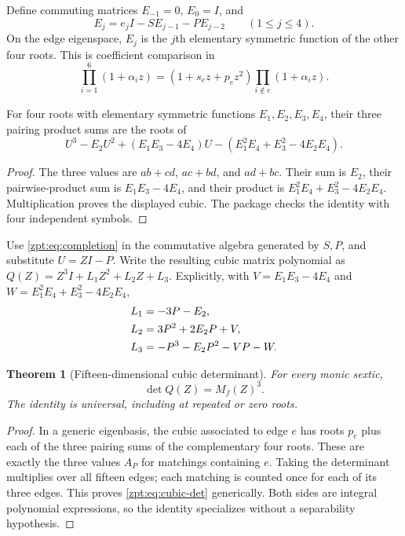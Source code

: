 \documentclass[11pt,letterpaper]{article}
\numberwithin{equation}{section}
\newtheorem{theorem}{Theorem}[section]
\theoremstyle{definition}
\theoremstyle{remark}
\begin{document}
Define commuting matrices $E_{-1}=0$, $E_0=I$, and
\begin{equation}
 E_j=e_jI-SE_{j-1}-PE_{j-2}\qquad(1\le j\le4).\label{zpt:eq:Ej}
\end{equation}
On the edge eigenspace, $E_j$ is the $j$th elementary symmetric function
of the other four roots. This is coefficient comparison in
\[
 \prod_{i=1}^6(1+\alpha_i z)
 =(1+s_ez+p_ez^2)\prod_{i\notin e}(1+\alpha_i z).
\]

\begin{lemma}
\label{zpt:lem:completion}
For four roots with elementary symmetric functions $E_1,E_2,E_3,E_4$,
their three pairing product sums are the roots of
\begin{equation}
 U^3-E_2U^2+(E_1E_3-4E_4)U
 -(E_1^2E_4+E_3^2-4E_2E_4).\label{zpt:eq:completion}
\end{equation}
\end{lemma}
\begin{proof}
The three values are $ab+cd$, $ac+bd$, and $ad+bc$.
Their sum is $E_2$, their pairwise-product sum is $E_1E_3-4E_4$, and their
product is $E_1^2E_4+E_3^2-4E_2E_4$. Multiplication proves the displayed
cubic. The package checks the identity with four independent symbols.
\end{proof}

Use \eqref{zpt:eq:completion} in the commutative algebra generated by $S,P$,
and substitute $U=ZI-P$. Write the resulting cubic matrix polynomial as
$Q(Z)=Z^3I+L_1Z^2+L_2Z+L_3$. Explicitly, with
$V=E_1E_3-4E_4$ and $W=E_1^2E_4+E_3^2-4E_2E_4$,
\begin{align}
 L_1&=-3P-E_2,\notag\\
 L_2&=3P^2+2E_2P+V,\notag\\
 L_3&=-P^3-E_2P^2-VP-W.\label{zpt:eq:Ls}
\end{align}

\begin{theorem}[Fifteen-dimensional cubic determinant]
\label{zpt:thm:cubic-matrix}
For every monic sextic,
\begin{equation}
 \boxed{\qquad\det Q(Z)=M_f(Z)^3.\qquad}\label{zpt:eq:cubic-det}
\end{equation}
The identity is universal, including at repeated or zero roots.
\end{theorem}
\begin{proof}
In a generic eigenbasis, the cubic associated to edge $e$ has roots
$p_e$ plus each of the three pairing sums of the complementary four
roots. These are exactly the three values $A_P$ for matchings containing
$e$. Taking the determinant multiplies over all fifteen edges; each
matching is counted once for each of its three edges. This proves
\eqref{zpt:eq:cubic-det} generically. Both sides are integral polynomial
expressions, so the identity specializes without a separability
hypothesis.
\end{proof}
\end{document}
